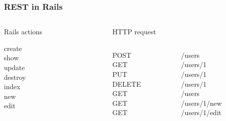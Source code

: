 
\begin{frame}
  \frametitle{REST in Rails}
  \begin{columns}
    \begin{column}{2.5cm}
      \begin{center}Rails actions\\\end{center}
        create\\
        show\\
        update\\
        destroy\\
        index\\
        new\\
        edit
    \end{column}
    \begin{column}{3.5cm}
      \begin{center}HTTP request\\\end{center}
        \begin{columns}
          \begin{column}{1.5cm}
            POST\\
            GET\\
            PUT\\
            DELETE\\
            GET\\
            GET\\
            GET
          \end{column}
          \begin{column}{2cm}
            /users\\
            /users/1\\
            /users/1\\
            /users/1\\
            /users\\
            /users/1/new\\
            /users/1/edit
          \end{column}
        \end{columns}
    \end{column}
  \end{columns}
\end{frame}


